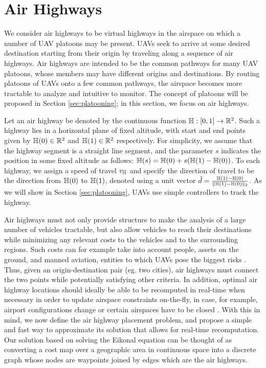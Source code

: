 \section{Air Highways}
We consider air highways to be virtual highways in the airspace on which a number of UAV platoons may be present. UAVs seek to arrive at some desired destination starting from their origin by traveling along a sequence of air highways. Air highways are intended to be the common pathways for many UAV platoons, whose members may have different origins and destinations. By routing platoons of UAVs onto a few common pathways, the airspace becomes more tractable to analyze and intuitive to monitor. The concept of platoons will be proposed in Section \ref{sec:platooning}; in this section, we focus on air highways.

Let an air highway be denoted by the continuous function $\mathbb{H}: [0, 1] \rightarrow \mathbb{R}^2$. Such a highway lies in a horizontal plane of fixed altitude, with start and end points given by $\mathbb{H}(0)\in\mathbb{R}^2$ and $\mathbb{H}(1)\in\mathbb{R}^2$ respectively. For simplicity, we assume that the highway segment is a straight line segment, and the parameter $s$ indicates the position in some fixed altitude as follows: $\mathbb{H}(s) = \mathbb{H}(0) + s(\mathbb{H}(1) - \mathbb{H}(0))$. To each highway, we assign a speed of travel $v_{\mathbb{H}}$ and specify the direction of travel to be the direction from $\mathbb{H}(0)$ to $\mathbb{H}(1)$, denoted using a unit vector $\hat{d} = \frac{\mathbb{H}(1) - \mathbb{H}(0)}{\lVert\mathbb{H}(1) - \mathbb{H}(0)\rVert_2}$. As we will show in Section \ref{sec:platooning}, UAVs use simple controllers to track the highway.

Air highways must not only provide structure to make the analysis of a large number of vehicles tractable, but also allow vehicles to reach their destinations while minimizing any relevant costs to the vehicles and to the surrounding regions. Such costs can for example take into account people, assets on the ground, and manned aviation, entities to which UAVs pose the biggest risks \cite{Kopardekar16}. Thus, given an origin-destination pair (eg. two cities), air highways must connect the two points while potentially satisfying other criteria. In addition, optimal air highway locations should ideally be able to be recomputed in real-time when necessary in order to update airspace constraints on-the-fly, in case, for example, airport configurations change or certain airspaces have to be closed \cite{Kopardekar16}. With this in mind, we now define the air highway placement problem, and propose a simple and fast way to approximate its solution that allows for real-time recomputation. Our solution based on solving the Eikonal equation can be thought of as converting a cost map over a geographic area in continuous space into a discrete graph whose nodes are waypoints joined by edges which are the air highways.

